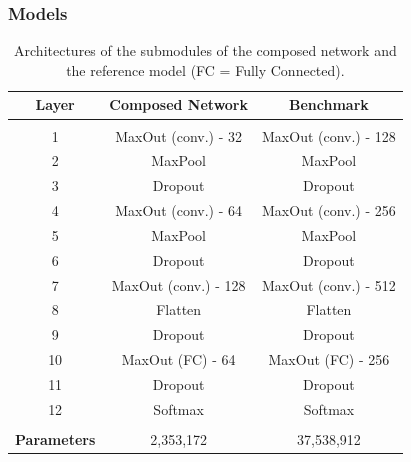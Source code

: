 \subsubsection{Models%
               \label{sec:experiments_cifar100_models}}

\begin{table}
    \centering
    \begin{tabular}{|c|c|c|}
        \hline
        \textbf{Layer} & \textbf{Composed Network} & \textbf{Benchmark} \\
        \hline
        \multicolumn{3}{c}{} \\[-2ex]
        \hline
        1 & MaxOut (conv.) - 32 & MaxOut (conv.) - 128 \\
        \hline
        2 & MaxPool & MaxPool \\
        \hline
        3 & Dropout & Dropout \\
        \hline
        4 & MaxOut (conv.) - 64 & MaxOut (conv.) - 256 \\
        \hline
        5 & MaxPool & MaxPool \\
        \hline
        6 & Dropout & Dropout \\
        \hline
        7 & MaxOut (conv.) - 128 & MaxOut (conv.) - 512 \\
        \hline
        8 & Flatten & Flatten \\
        \hline
        9 & Dropout & Dropout \\
        \hline
        10 & MaxOut (FC) - 64 & MaxOut (FC) - 256 \\
        \hline
        11 & Dropout & Dropout \\
        \hline
        12 & Softmax & Softmax \\
        \hline
        \multicolumn{3}{c}{} \\[-2ex]
        \hline
        \textbf{Parameters} & 2,353,172 & 37,538,912 \\
        \hline
    \end{tabular}
    \caption{Architectures of the submodules of the composed network and the reference model (FC = Fully Connected).}
    \label{tab:experiments_cifar100_models_structure}
\end{table}


